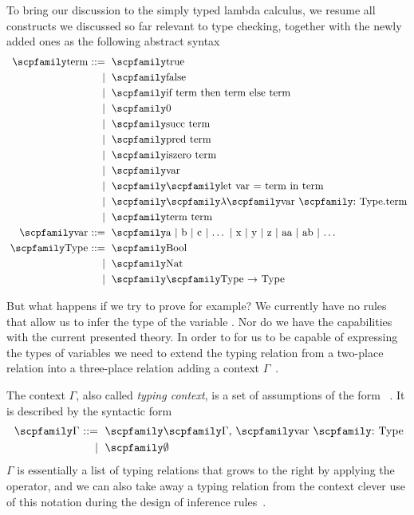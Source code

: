 \documentclass[
  oneside,
  english,
  coorientadorbanca,
  noabntexcite
]{ufsc-thesis-rn46-2019}
\def\bnfdef{::=}
\newcommand{\codett}[1]{\text{\scpfamily#1}}
\newcommand{\code}[1]{\text{\scpfamily\setlength\spaceskip{0.35em}#1}}
\newcommand{\bnfvar}[1]{\codett{#1}}
\newcommand{\bnfmore}[1]{            & \ & \mid{}    & \ \code{#1}}
\newcommand{\astprod}[2]{\code{#1} & \ & \bnfdef{} & \ \code{#2}}
\newcommand{\astmore}[1]{\bnfmore{#1}}
\newcommand{\typer}[2]{\code{#1 \codett{:} #2}}
\newcommand{\fnty}[2]{\code{#1 $\rightarrow$ #2}}
\newcommand{\fnabs}[3]{\code{$\lambda$\typer{#1}{#2}.#3}}
\newcommand{\astlet}[3]{\code{let #1 = #2 in #3}}
\begin{document}
To bring our discussion to the simply typed lambda calculus, we resume all constructs we discussed so far relevant to type checking, together with the newly added ones as the following abstract syntax
\begin{equation}~\label{eq:simply_typed_lc}
  \begin{alignedat}{2}
    \astprod{term}{true} \\
    \astmore{false} \\
    \astmore{if term then term else term} \\
    \astmore{0} \\
    \astmore{succ term} \\
    \astmore{pred term} \\
    \astmore{iszero term} \\
    \astmore{var} \\
    \astmore{\astlet{var}{term}{term}} \\
    \astmore{\fnabs{var}{Type}{term}} \\
    \astmore{term term} \\
    \astprod{var}{a $\mid$ b $\mid$ c $\mid$ $\dots$ $\mid$ x $\mid$ y $\mid$ z $\mid$ aa $\mid$ ab $\mid$ $\dots$} \\
    \astprod{Type}{Bool} \\
    \astmore{Nat} \\
    \astmore{\fnty{Type}{Type}}
  \end{alignedat}
\end{equation}

But what happens if we try to prove \typer{succ a}{Nat} for example?
We currently have no rules that allow us to infer the type of the variable \codett{a}.
Nor do we have the capabilities with the current presented theory.
In order to for us to be capable of expressing the types of variables we need to extend the typing relation from a two-place relation into a three-place relation adding a context $\Gamma$~\cite{pierce2002types}.

The context $\Gamma$, also called \textit{typing context}, is a set of assumptions of the form \typer{var}{Type}~\cite{pierce2002types}.
It is described by the syntactic form
\begin{equation}~\label{eq:sample_term_ast_bool_g}
  \begin{alignedat}{2}
    \astprod{$\Gamma$}{\bnfvar{$\Gamma$}, \typer{var}{Type}} \\
    \bnfmore{$\emptyset$}
  \end{alignedat}
\end{equation}
$\Gamma$ is essentially a list of typing relations that grows to the right by applying the \code{,} operator, and we can also take away a typing relation from the context clever use of this notation during the design of inference rules~\cite{pierce2002types}.
\end{document}
